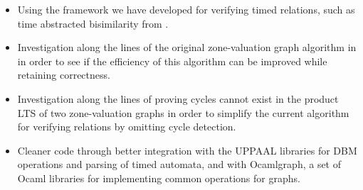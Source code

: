 \documentclass[a4paper]{llncs}
\begin{document}
\begin{itemize}
\item Using the framework we have developed for verifying timed
  relations, such as time abstracted bisimilarity from
  \cite{DBLP:conf/cav/GuhaNA12}.
\item Investigation along the lines of the original zone-valuation
  graph algorithm in \cite{DBLP:conf/cav/GuhaNA12} in order to see if the
  efficiency of this algorithm can be improved while retaining
  correctness.
\item Investigation along the lines of proving cycles cannot exist in
  the product LTS of two zone-valuation graphs in order to simplify
  the current algorithm for verifying relations by omitting cycle detection.
\item Cleaner code through better integration with the UPPAAL
  libraries for DBM operations and parsing of timed automata, and with
  Ocamlgraph, a set of Ocaml libraries for implementing common
  operations for graphs.
\end{itemize}

  
  
  
\end{document}
